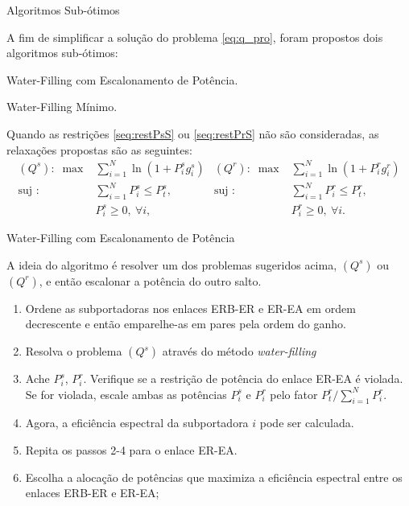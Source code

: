 \begin{frame}{Algoritmos Sub-ótimos}
   \begin{bigitem}
      \item A fim de simplificar a solução do problema \eqref{eq:q_pro}, foram propostos dois algoritmos sub-ótimos:
      \begin{bigitem}
         \item Water-Filling com Escalonamento de Potência.
         \item Water-Filling Mínimo.
      \end{bigitem}
      \item Quando as restrições \eqref{seq:restPsS} ou \eqref{seq:restPrS} não são consideradas, as relaxações propostas são as seguintes:
      \begin{align*}
      (Q^s): \; \max & \sum_{i=1}^{N} \ln \left( 1 + P^s_i g^s_i\right) & (Q^r): \; \max & \sum_{i=1}^{N} \ln \left( 1 + P^r_i  g^r_i\right) \\
      \text{suj :} \quad & \sum_{i=1}^{N} P^s_i \leq P^s_t,                 & \text{suj :} \quad & \sum_{i=1}^{N} P^r_i \leq P^r_t, \\
                    & P^s_i \geq 0,   \:\forall i,                     &               & P^r_i \geq 0,   \: \forall i.
      \end{align*}      
   \end{bigitem}
\end{frame}

\begin{frame}{Water-Filling com Escalonamento de Potência}
   \begin{bigitem}
      \item A ideia do algoritmo é resolver um dos problemas sugeridos acima, $(Q^s)$ ou $(Q^r)$, e então escalonar a potência do outro salto.
      \begin{enumerate}[\noindent i)]
        \item Ordene as subportadoras nos enlaces ERB-ER e ER-EA em ordem decrescente e então emparelhe-as em pares pela ordem do ganho.
        \item Resolva o problema $(Q^s)$ através do método \textit{water-filling}
        \item Ache $P_i^s$, $P^r_i$. Verifique se a restrição de potência do enlace ER-EA é violada. Se for violada, escale ambas as potências $P_i^s$ e $P^r_i$ pelo fator $P^r_t/\sum_{i=1}^N P_i^r$.
        \item Agora, a eficiência espectral da subportadora $i$ pode ser calculada.
        \item Repita os passos 2-4 para o enlace ER-EA.
        \item Escolha a alocação de potências que maximiza a eficiência espectral entre os enlaces ERB-ER e ER-EA;
      \end{enumerate}
   \end{bigitem}
\end{frame}

